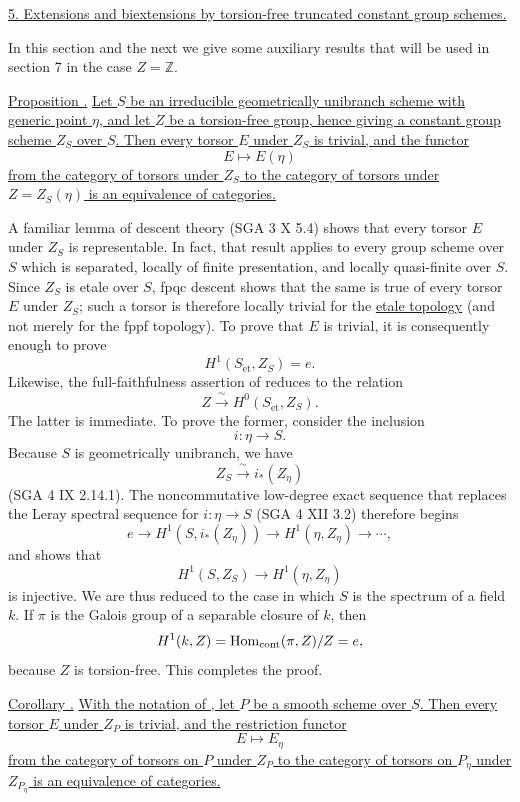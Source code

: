 
\medskip
\noindent\underline{5.  Extensions and biextensions by torsion-free
truncated constant group schemes.}

In this section and the next we give some auxiliary results that will
be used in section 7 in the case $Z=\mathbb Z$.

\medskip
\noindent\underline{Proposition .}  \underline{Let $S$ be an
irreducible geometrically unibranch scheme with generic point $\eta$,
and let $Z$ be a torsion-free group, hence giving a constant group
scheme $Z_S$ over $S$.  Then every torsor $E$ under $Z_S$ is trivial,
and the functor}
\[
 E\longmapsto E(\eta)
\]
\underline{from the category of torsors under $Z_S$ to the category of
torsors under $Z=Z_S(\eta)$ is an equivalence of categories.}

A familiar lemma of descent theory (SGA 3 X 5.4) shows that every
torsor $E$ under $Z_S$ is representable.  In fact, that result applies
to every group scheme over $S$ which is separated, locally of finite
presentation, and locally quasi-finite over $S$.  Since $Z_S$ is
etale over $S$, fpqc descent shows that the same is true of every
torsor $E$ under $Z_S$; such a torsor is therefore locally trivial for
the \underline{etale topology} (and not merely for the fppf topology).
To prove that $E$ is trivial, it is consequently enough to prove
\[
 H^1(S_{\mathrm{\acute{e}t}},Z_S)=e.
\]
Likewise, the full-faithfulness assertion of  reduces to the
relation
\[
 Z\xrightarrow{\ \sim\ }H^0(S_{\mathrm{\acute{e}t}},Z_S).
\]
The latter is immediate.  To prove the former, consider the inclusion
\[
 i:\eta\longrightarrow S.
\]
Because $S$ is geometrically unibranch, we have
\[
 Z_S\xrightarrow{\ \sim\ }i_*(Z_\eta)
\]
(SGA 4 IX 2.14.1).  The noncommutative low-degree exact sequence that
replaces the Leray spectral sequence for $i:\eta\to S$ (SGA 4 XII
3.2) therefore begins
\[
 e\longrightarrow H^1(S,i_*(Z_\eta))
   \longrightarrow H^1(\eta,Z_\eta)\longrightarrow\cdots,
\]
and shows that
\[
 H^1(S,Z_S)\longrightarrow H^1(\eta,Z_\eta)
\]
is injective.  We are thus reduced to the case in which $S$ is the
spectrum of a field $k$.  If $\pi$ is the Galois group of a separable
closure of $k$, then
\[
 H^1(k,Z)=\operatorname{Hom}_{\mathrm{cont}}(\pi,Z)/Z=e,
\]
because $Z$ is torsion-free.  This completes the proof.

\medskip
\noindent\underline{Corollary .}  \underline{With the notation of
, let $P$ be a smooth scheme over $S$.  Then every torsor $E$ under
$Z_P$ is trivial, and the restriction functor}
\[
 E\longmapsto E_\eta
\]
\underline{from the category of torsors on $P$ under $Z_P$ to the
category of torsors on $P_\eta$ under $Z_{P_\eta}$ is an equivalence of
categories.}

